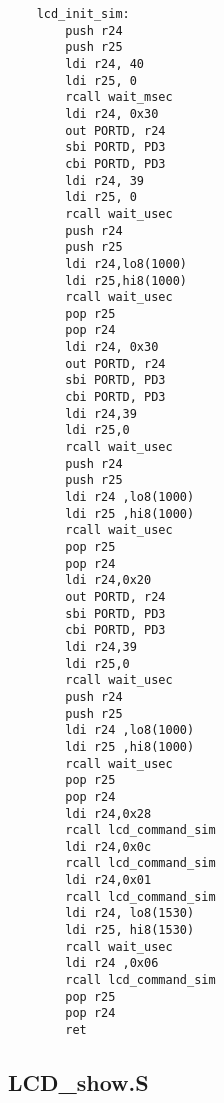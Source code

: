 \documentclass{article}
\begin{document}
\begin{verbatim}
	lcd_init_sim:
        push r24
        push r25
        ldi r24, 40
        ldi r25, 0
        rcall wait_msec
        ldi r24, 0x30
        out PORTD, r24
        sbi PORTD, PD3
        cbi PORTD, PD3
        ldi r24, 39
        ldi r25, 0
        rcall wait_usec
        push r24
        push r25
        ldi r24,lo8(1000)
        ldi r25,hi8(1000)
        rcall wait_usec
        pop r25
        pop r24
        ldi r24, 0x30
        out PORTD, r24
        sbi PORTD, PD3
        cbi PORTD, PD3
        ldi r24,39
        ldi r25,0
        rcall wait_usec 
        push r24
        push r25
        ldi r24 ,lo8(1000)
        ldi r25 ,hi8(1000)
        rcall wait_usec
        pop r25
        pop r24
        ldi r24,0x20
        out PORTD, r24
        sbi PORTD, PD3
        cbi PORTD, PD3
        ldi r24,39
        ldi r25,0
        rcall wait_usec
        push r24
        push r25
        ldi r24 ,lo8(1000)
        ldi r25 ,hi8(1000)
        rcall wait_usec
        pop r25
        pop r24
        ldi r24,0x28
        rcall lcd_command_sim
        ldi r24,0x0c
        rcall lcd_command_sim
        ldi r24,0x01
        rcall lcd_command_sim
        ldi r24, lo8(1530)
        ldi r25, hi8(1530)
        rcall wait_usec
        ldi r24 ,0x06
        rcall lcd_command_sim
        pop r25
        pop r24
        ret

\end{verbatim}

\subsection*{LCD\_show.S}
\end{document}
